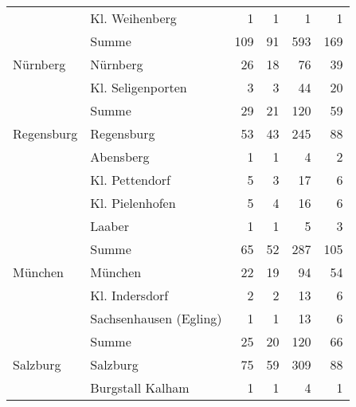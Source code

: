 \begin{xltabular}{\textwidth}{X l R R R R}

	& Kl. Weihenberg
	& 1
	& 1
	& 1
	& 1
	\\


	& Summe
	& 109 %
	& 91 %
	& 593 %
	& 169 %
	\\

\midrule

Nürnberg
	& Nürnberg
	& 26
	& 18
	& 76
	& 39
	\\

	& Kl. Seligenporten
	& 3
	& 3
	& 44
	& 20
	\\


	& Summe
	& 29
	& 21
	& 120
	& 59
	\\

\midrule

Regensburg
	& Regensburg
	& 53
	& 43
	& 245
	& 88
	\\

	& Abensberg
	& 1
	& 1
	& 4
	& 2
	\\

	& Kl. Pettendorf
	& 5
	& 3
	& 17
	& 6
	\\

	& Kl. Pielenhofen
	& 5
	& 4
	& 16
	& 6
	\\

	& Laaber
	& 1
	& 1
	& 5
	& 3
	\\


	& Summe
	& 65
	& 52
	& 287
	& 105
	\\

\midrule

München
	& München
	& 22
	& 19
	& 94
	& 54
	\\

	& Kl. Indersdorf
	& 2
	& 2
	& 13
	& 6
	\\

	& Sachsenhausen (Egling)
	& 1
	& 1
	& 13
	& 6
	\\


	& Summe
	& 25
	& 20
	& 120
	& 66
	\\

\midrule

Salzburg
	& Salzburg
	& 75
	& 59
	& 309
	& 88
	\\

	& Burgstall Kalham
	& 1
	& 1
	& 4
	& 1
	\\


\end{xltabular}

